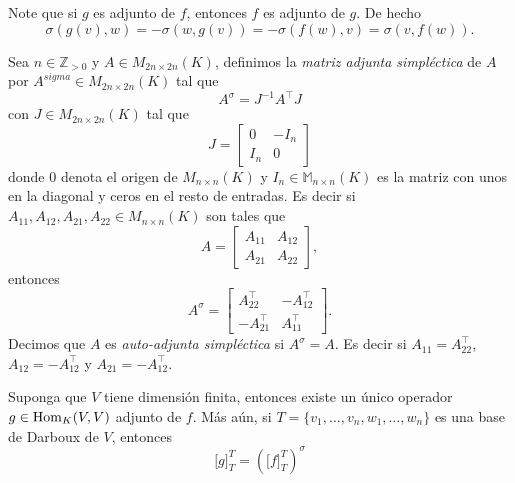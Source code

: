 \begin{obs}
Note que si $g$ es adjunto de $f$, entonces $f$ es adjunto de $g$. De hecho
\[
\sigma\left( g(v),w\right)= -\sigma\left( w,g(v)\right)= -\sigma\left( f(w),v\right)= \sigma\left(v,f(w)\right).
\]
\end{obs}

\begin{defn}
Sea $n\in\mathbb{Z}_{>0}$ y $A\in M_{2n\times 2n}(K)$, definimos la \emph{matriz adjunta simpl\'ectica} de $A$ por $A^{sigma}\in M_{2n\times 2n}(K)$ tal que
\[
A^\sigma=J^{-1}A^\intercal J
\]
con $J\in M_{2n\times 2n}(K)$ tal que
\[
J=\left[\begin{array}{cc} 0 & -I_n\\I_n & 0\end{array}\right]
\]
donde $0$ denota el origen de $M_{n\times n}(K)$ y $I_n\in\mathbb{M}_{n\times n}(K)$ es la matriz con unos en la diagonal y ceros en el resto de entradas. Es decir si $A_{11},A_{12},A_{21},A_{22}\in M_{n\times n}(K)$ son tales que
\[
A=\left[\begin{array}{cc} A_{11} & A_{12}\\A_{21} & A_{22}\end{array}\right],
\]
entonces
\[
A^\sigma=\left[\begin{array}{cc} A_{22}^\intercal & -A_{12}^\intercal\\-A_{21}^\intercal & A_{11}^\intercal\end{array}\right].
\]
Decimos que $A$ es \emph{auto-adjunta simpl\'ectica} si $A^\sigma=A$. Es decir si $A_{11}=A_{22}^\intercal$, $A_{12}=-A_{12}^\intercal$ y $A_{21}=-A_{12}^\intercal$.
\end{defn}


\begin{prop}\label{adjtrassim}
Suponga que $V$ tiene dimensi\'on finita, entonces existe un \'unico operador $g\in\operatorname{Hom}_{K}(V,V)$ adjunto de $f$. M\'as a\'un, si $T=\{v_1,\ldots,v_n,w_1,\ldots,w_n\}$ es una base de Darboux de $V$, entonces
\[
\Big[g\Big]^T_T=\left(\Big[f\Big]^T_T\right)^\sigma
\]
\end{prop}

